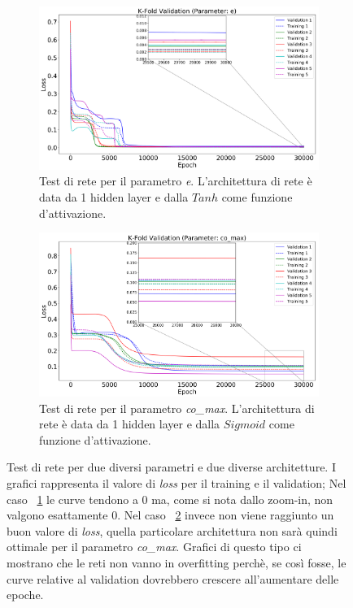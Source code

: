 \documentclass[12pt,a4paper,final]{book}
\begin{document}
\begin{figure}[!ht]
\centering
	\begin{subfigure}{\textwidth}
	    \centering
	    \includegraphics[width=0.8\linewidth]{../figures/validation_e_zoom.png}
	    \caption{Test di rete per il parametro \textit{e}. L'architettura di rete è data da 1 hidden layer e dalla $Tanh$ come funzione d'attivazione.}
	    \label{test1}
	\end{subfigure}
	\newline
	\begin{subfigure}{\textwidth}
		\centering
	    \includegraphics[width=0.8\linewidth]{../figures/validation_co_max_zoom.png}
		\caption{Test di rete per il parametro \textit{co\_max}. L'architettura di rete è data da 1 hidden layer e dalla $Sigmoid$ come funzione d'attivazione.}
		\label{test2}
	\end{subfigure}
	\caption{Test di rete per due diversi parametri e due diverse architetture. I grafici rappresenta il valore di \textit{loss} per il training e il validation; Nel caso ~\ref{test1} le curve tendono a 0 ma, come si nota dallo zoom-in, non valgono esattamente 0. Nel caso ~\ref{test2} invece non viene raggiunto un buon valore di \textit{loss}, quella particolare architettura non sarà quindi ottimale per il parametro \textit{co\_max}. Grafici di questo tipo ci mostrano che le reti non vanno in overfitting perchè, se così fosse, le curve relative al validation dovrebbero crescere all'aumentare delle epoche.}
	\label{test_rete}
\end{figure}
\end{document}
